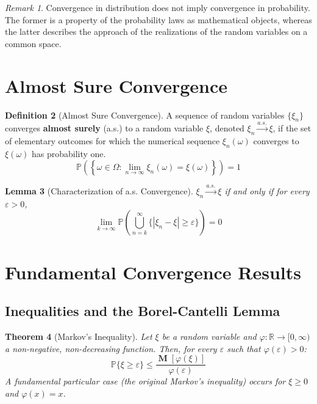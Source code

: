 \documentclass[12pt, openany]{book}
\theoremstyle{definition}
\newtheorem{definition}{Definition}[section]
\theoremstyle{plain}
\newtheorem{theorem}[definition]{Theorem}
\newtheorem{lemma}[definition]{Lemma}
\theoremstyle{remark}
\newtheorem{remark}[definition]{Remark}
\newcommand{\R}{\mathbb{R}}
\newcommand{\probP}{\mathbb{P}}
\DeclareMathOperator{\M}{\mathbf{M}} %
\begin{document}
\begin{remark}
Convergence in distribution does not imply convergence in probability. The former is a property of the probability laws as mathematical objects, whereas the latter describes the approach of the realizations of the random variables on a common space.
\end{remark}

\section{Almost Sure Convergence}

\begin{definition}[Almost Sure Convergence]
A sequence of random variables $\{\xi_n\}$ converges \textbf{almost surely} (a.s.) to a random variable $\xi$, denoted $\xi_n \xrightarrow{a.s.} \xi$, if the set of elementary outcomes for which the numerical sequence $\xi_n(\omega)$ converges to $\xi(\omega)$ has probability one.
$$ \probP\left(\left\{\omega \in \Omega : \lim_{n \to \infty} \xi_n(\omega) = \xi(\omega)\right\}\right) = 1 $$
\end{definition}

\begin{lemma}[Characterization of a.s. Convergence]
$\xi_n \xrightarrow{a.s.} \xi$ if and only if for every $\varepsilon > 0$,
$$ \lim_{k \to \infty} \probP\left(\bigcup_{n=k}^\infty \{|\xi_n - \xi| \ge \varepsilon\}\right) = 0 $$
\end{lemma}

\section{Fundamental Convergence Results}

\subsection{Inequalities and the Borel-Cantelli Lemma}

\begin{theorem}[Markov's Inequality]
Let $\xi$ be a random variable and $\varphi: \R \to [0, \infty)$ a non-negative, non-decreasing function. Then, for every $\varepsilon$ such that $\varphi(\varepsilon)>0$:
$$ \probP\{\xi \ge \varepsilon\} \le \frac{\M[\varphi(\xi)]}{\varphi(\varepsilon)} $$
A fundamental particular case (the original Markov's inequality) occurs for $\xi \ge 0$ and $\varphi(x)=x$.
\end{theorem}
\end{document}
